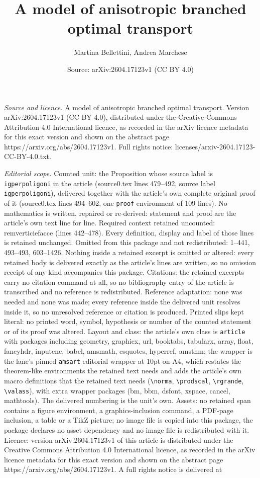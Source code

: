\documentclass[10pt,a4paper]{amsart}
\title[A model of anisotropic branched optimal transport]{A model of anisotropic branched optimal transport}
\author{Martina Bellettini, Andrea Marchese}
\date{Source: arXiv:2604.17123v1 (CC BY 4.0)}
\begin{document}
\maketitle

\noindent\emph{Source and licence.} A model of anisotropic branched optimal transport. Version arXiv:2604.17123v1 (CC BY 4.0), distributed under the Creative Commons Attribution 4.0 International licence, as recorded in the arXiv licence metadata for this exact version and shown on the abstract page https://arxiv.org/abs/2604.17123v1. Full rights notice: licenses/arxiv-2604.17123-CC-BY-4.0.txt.\par\smallskip

\noindent\textit{Editorial scope.} Counted unit: the Proposition whose source label is \texttt{igperpoligoni} in the article (source0.tex lines 479--492, source label \texttt{igperpoligoni}), delivered together with the article's own complete original proof of it (source0.tex lines 494--602, one \texttt{proof} environment of 109 lines). No mathematics is written, repaired or re-derived: statement and proof are the article's own text line for line. Required context retained uncounted: remverticiefacce (lines 442--478). Every definition, display and label of those lines is retained unchanged. Omitted from this package and not redistributed: 1--441, 493--493, 603--1426. Nothing inside a retained excerpt is omitted or altered: every retained body is delivered exactly as the article's lines are written, so no omission receipt of any kind accompanies this package. Citations: the retained excerpts carry no citation command at all, so no bibliography entry of the article is transcribed and no reference is redistributed. Reference adaptation: none was needed and none was made; every reference inside the delivered unit resolves inside it, so no unresolved reference or citation is produced. Printed slips kept literal: no printed word, symbol, hypothesis or number of the counted statement or of its proof was altered. Layout and class: the article's own class is \texttt{article} with packages including geometry, graphicx, url, booktabs, tabularx, array, float, fancyhdr, inputenc, babel, amsmath, csquotes, hyperref, amsthm; the wrapper is the lane's pinned \texttt{amsart} editorial wrapper at 10pt on A4, which restates the theorem-like environments the retained text needs and adds the article's own macro definitions that the retained text needs (\texttt{\textbackslash norma}, \texttt{\textbackslash prodscal}, \texttt{\textbackslash rgrande}, \texttt{\textbackslash valass}), with extra wrapper packages (bm, bbm, dsfont, xspace, cancel, mathtools). The delivered numbering is the unit's own. Assets: no retained span contains a figure environment, a graphics-inclusion command, a PDF-page inclusion, a table or a TikZ picture; no image file is copied into this package, the package declares no asset dependency and no image file is redistributed with it. Licence: version arXiv:2604.17123v1 of this article is distributed under the Creative Commons Attribution 4.0 International licence, as recorded in the arXiv licence metadata for this exact version and shown on the abstract page https://arxiv.org/abs/2604.17123v1. A full rights notice is delivered at 
\end{document}
